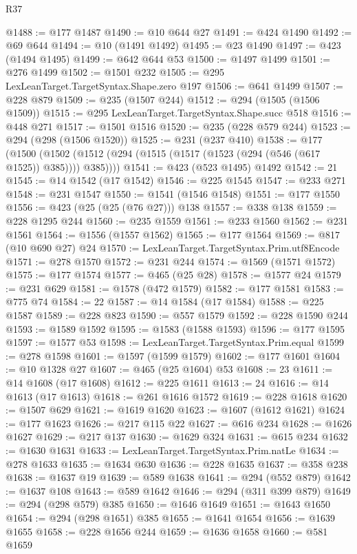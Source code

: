 \begin{lexlean}{R37}
\begin{coremodule}
@1488 := @177 @1487
@1490 := @10 @644 @27
@1491 := @424 @1490
@1492 := @69 @644
@1494 := @10 (@1491 @1492)
@1495 := @23 @1490
@1497 := @423 (@1494 @1495)
@1499 := @642 @644 @53
@1500 := @1497 @1499
@1501 := @276 @1499
@1502 := @1501 @232
@1505 := @295 LexLeanTarget.TargetSyntax.Shape.zero @197
@1506 := @641 @1499
@1507 := @228 @879
@1509 := @235 (@1507 @244)
@1512 := @294 (@1505 (@1506 @1509))
@1515 := @295 LexLeanTarget.TargetSyntax.Shape.succ @518
@1516 := @448 @271
@1517 := @1501 @1516
@1520 := @235 (@228 @579 @244)
@1523 := @294 (@298 (@1506 @1520))
@1525 := @231 (@237 @410)
@1538 := @177
    (@1500 (@1502 (@1512 (@294 (@1515 (@1517 (@1523 (@294 (@546 (@617 @1525)) @385)))) @385))))
@1541 := @423 (@523 @1495) @1492
@1542 := 21
@1545 := @14 @1542 (@17 @1542)
@1546 := @225 @1545
@1547 := @233 @271
@1548 := @231 @1547
@1550 := @1541 (@1546 @1548)
@1551 := @177 @1550
@1556 := @423 (@25 (@25 (@76 @27))) @138
@1557 := @338 @138
@1559 := @228 @1295 @244
@1560 := @235 @1559
@1561 := @233 @1560
@1562 := @231 @1561
@1564 := @1556 (@1557 @1562)
@1565 := @177 @1564
@1569 := @817 (@10 @690 @27) @24
@1570 := LexLeanTarget.TargetSyntax.Prim.utf8Encode
@1571 := @278 @1570
@1572 := @231 @244
@1574 := @1569 (@1571 @1572)
@1575 := @177 @1574
@1577 := @465 (@25 @28)
@1578 := @1577 @24
@1579 := @231 @629
@1581 := @1578 (@472 @1579)
@1582 := @177 @1581
@1583 := @775 @74
@1584 := 22
@1587 := @14 @1584 (@17 @1584)
@1588 := @225 @1587
@1589 := @228 @823
@1590 := @557 @1579
@1592 := @228 @1590 @244
@1593 := @1589 @1592
@1595 := @1583 (@1588 @1593)
@1596 := @177 @1595
@1597 := @1577 @53
@1598 := LexLeanTarget.TargetSyntax.Prim.equal
@1599 := @278 @1598
@1601 := @1597 (@1599 @1579)
@1602 := @177 @1601
@1604 := @10 @1328 @27
@1607 := @465 (@25 @1604) @53
@1608 := 23
@1611 := @14 @1608 (@17 @1608)
@1612 := @225 @1611
@1613 := 24
@1616 := @14 @1613 (@17 @1613)
@1618 := @261 @1616 @1572
@1619 := @228 @1618
@1620 := @1507 @629
@1621 := @1619 @1620
@1623 := @1607 (@1612 @1621)
@1624 := @177 @1623
@1626 := @217 @115 @22
@1627 := @616 @234
@1628 := @1626 @1627
@1629 := @217 @137
@1630 := @1629 @324
@1631 := @615 @234
@1632 := @1630 @1631
@1633 := LexLeanTarget.TargetSyntax.Prim.natLe
@1634 := @278 @1633
@1635 := @1634 @630
@1636 := @228 @1635
@1637 := @358 @238
@1638 := @1637 @19
@1639 := @589 @1638
@1641 := @294 (@552 @879)
@1642 := @1637 @108
@1643 := @589 @1642
@1646 := @294 (@311 @399 @879)
@1649 := @294 (@298 @579) @385
@1650 := @1646 @1649
@1651 := @1643 @1650
@1654 := @294 (@298 @1651) @385
@1655 := @1641 @1654
@1656 := @1639 @1655
@1658 := @228 @1656 @244
@1659 := @1636 @1658
@1660 := @581 @1659

\end{coremodule}
\end{lexlean}

